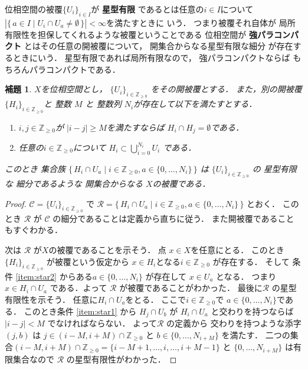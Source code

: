 \documentclass[leqno, a4paper, 12pt]{jsarticle}
\newtheorem{lem}[thm]{補題}
\newcommand{\zz}{\mathbb{Z}}
\begin{document}
位相空間の被覆$\{U_{i}\}_{i\in I}$が
\textbf{星型有限}
であるとは任意の$i\in I$について
$|\{\, a\in I\mid U_{i}\cap U_{a}\neq \emptyset\, \}|<\infty$を満たすときに
いう．
つまり被覆それ自体が
局所有限性を担保してくれるような被覆ということである
位相空間が
\textbf{強パラコンパクト}
とはその任意の開被覆について，
開集合からなる星型有限な細分
が存在するときにいう．
星型有限であれば局所有限なので，
強パラコンパクトならば
もちろんパラコンパクトである．

\begin{lem}\label{lem:star}
$X$を位相空間とし，
$\{U_{i}\}_{i\in \zz_{\ge 0}}$
をその開被覆とする．
また，別の開被覆
$\{H_{i}\}_{i\in \zz_{\ge 0}}$と
整数
$M$
と
整数列
$N_{i}$が存在して以下を満たすとする．
\begin{enumerate}[label=\textup{(\arabic*)}]
\item\label{item:star1}
$i, j\in \zz_{\ge 0}$が
$|i-j|\ge M$を満たすならば
$H_{i}\cap H_{j}=\emptyset$である．
\item\label{item:star2}
任意の$i\in \zz_{\ge 0}$について
$H_{i}\subset \bigcup_{i=0}^{N_{i}}U_{i}$
である．
\end{enumerate}
このとき
集合族
$\{\, H_{i}\cap U_{a}\mid i\in \zz_{\ge 0}, 
a\in \{0, \dots, N_{i}\}\, \}$
は
$\{U_{i}\}_{i\in \zz_{\ge 0}}$
の
星型有限な
細分であるような
開集合からなる
$X$の被覆である．
\end{lem}
\begin{proof}
$\mathcal{C}=\{U_{i}\}_{i\in \zz_{\ge 0}}$ で
$\mathcal{R}=\{\, H_{i}\cap U_{a}\mid i\in \zz_{\ge 0}, 
a\in \{0, \dots, N_{i}\}\, \}$
とおく．
このとき
$\mathcal{R}$
が
$\mathcal{C}$
の細分であることは定義から直ちに従う．
また開被覆であることもすぐわかる．


次は
$\mathcal{R}$
が$X$の被覆であることを示そう．
点
$x\in X$を任意にとる．
このとき$\{H_{i}\}_{i\in \zz_{\ge 0}}$
が被覆という仮定から
$x\in H_{i}$となる$i\in \zz_{\ge 0}$
が存在する．
そして
条件
\ref{item:star2}
からある$a\in \{0, \dots, N_{i}\}$
が存在して
$x\in U_{a}$
となる．
つまり$x\in H_{i}\cap U_{a}$
である．よって
$\mathcal{R}$
が被覆であることがわかった．
最後に$\mathcal{R}$
の星型有限性を示そう．
任意に$H_{i}\cap U_{a}$をとる．
ここで$i\in \zz_{\ge 0}$で
$a\in \{0, \dots, N_{i}\}$である．
このとき条件
\ref{item:star1}
から
$H_{j}\cap U_{b}$
が
$H_{i}\cap U_{a}$
と交わりを持つならば
$|i-j|<M$
でなければならない．
よって$\mathcal{R}$
の定義から
交わりを持つような添字
$(j, b)$
は
$j\in (i-M, i+M)\cap \zz_{\ge 0}$
と
$b\in \{0, \dots, N_{i+M}\}$
を満たす．
二つの集合$(i-M, i+M)\cap \zz_{\ge 0}
=\{i-M+1, \dots, i, \dots, i+M-1\}$
と
$\{0, \dots, N_{i+M}\}$
は有限集合なので
$\mathcal{R}$
の星型有限性がわかった．
\end{proof}
\end{document}
